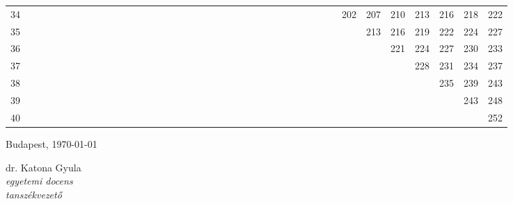 \documentclass[12pt,a4paper]{article}
\begin{document}
\begin{center}
{\begin{tabular}{r|*{39}{c}}
34 &   &   &   &   &   &   &   &   &   &   &   &   &   &   &   &   &   &   &   &   &   &   &   &   &   &   &   &   &   &   &   &   & 202 & 207 & 210 & 213 & 216 & 218 & 222 \\
35 &   &   &   &   &   &   &   &   &   &   &   &   &   &   &   &   &   &   &   &   &   &   &   &   &   &   &   &   &   &   &   &   &   & 213 & 216 & 219 & 222 & 224 & 227 \\
36 &   &   &   &   &   &   &   &   &   &   &   &   &   &   &   &   &   &   &   &   &   &   &   &   &   &   &   &   &   &   &   &   &   &   & 221 & 224 & 227 & 230 & 233 \\
37 &   &   &   &   &   &   &   &   &   &   &   &   &   &   &   &   &   &   &   &   &   &   &   &   &   &   &   &   &   &   &   &   &   &   &   & 228 & 231 & 234 & 237 \\
38 &   &   &   &   &   &   &   &   &   &   &   &   &   &   &   &   &   &   &   &   &   &   &   &   &   &   &   &   &   &   &   &   &   &   &   &   & 235 & 239 & 243 \\
39 &   &   &   &   &   &   &   &   &   &   &   &   &   &   &   &   &   &   &   &   &   &   &   &   &   &   &   &   &   &   &   &   &   &   &   &   &   & 243 & 248 \\
40 &   &   &   &   &   &   &   &   &   &   &   &   &   &   &   &   &   &   &   &   &   &   &   &   &   &   &   &   &   &   &   &   &   &   &   &   &   &   & 252 \\
\end{tabular}
}
\vspace{1em}
\end{center}


\vspace{1cm}\vfill
Budapest, \today
\begin{flushright}
\begin{minipage}{0.5\textwidth}
\begin{center}
	dr. Katona Gyula\\
	\textit{egyetemi docens}\\
	\textit{tanszékvezető}
\end{center}
\end{minipage}
\end{flushright}
\vfill
\end{document}
